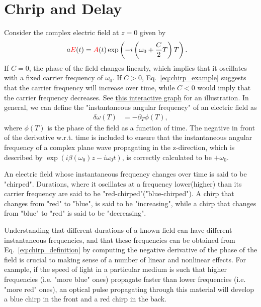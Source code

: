 \section{Chrip and Delay}
Consider the complex electric field at $z=0$ given by
\begin{align}
\label{eq:chirp_example}
    a\textcolor{red}{E}(t) &= \textcolor{red}{A}(t)\exp\left(  -i\left(\omega_0 +\frac{C}{2}T \right)T   \right).
\end{align}
If $C=0$, the phase of the field changes linearly, which implies that it oscillates with a fixed carrier frequency of $\omega_0$. If $C>0$, Eq.~\ref{eq:chirp_example} suggests that the carrier frequency will increase over time, while $C<0$ would imply that the carrier frequency decreases. See \href{https://www.desmos.com/calculator/gd7s8nhfdn}{this interactive graph} for an illustration. In general, we can define the "instantaneous angular frequency" of an electric field as
\begin{align}
\label{eq:chirp_definition}
    \delta\omega(T) &= -\partial_T\phi(T),
\end{align}
where $\phi(T)$ is the phase of the field as a function of time. The negative in front of the derivative w.r.t. time is included to ensure that the instantaneous angular frequency of a complex plane wave propagating in the z-direction, which is described by $\exp(i\beta(\omega_0)z-i\omega_0 t)$, is correctly calculated to be $+\omega_0$.

An electric field whose instantaneous frequency changes over time is said to be "chirped". Durations, where it oscillates at a frequency lower(higher) than its carrier frequency are said to be "red-chirped"("blue-chirped"). A chirp that changes from "red" to "blue", is said to be "increasing", while a chirp that changes from "blue" to "red" is said to be "decreasing". 

Understanding that different durations of a known field can have different instantaneous frequencies, and that these frequencies can be obtained from Eq.~\ref{eq:chirp_definition} by computing the negative derivative of the phase of the field is crucial to making sense of a number of linear and nonlinear effects. For example, if the speed of light in a particular medium is such that higher frequencies (i.e. "more blue" ones) propagate faster than lower frequencies (i.e. "more red" ones), an optical pulse propagating through this material will develop a blue chirp in the front and a red chirp in the back. 

